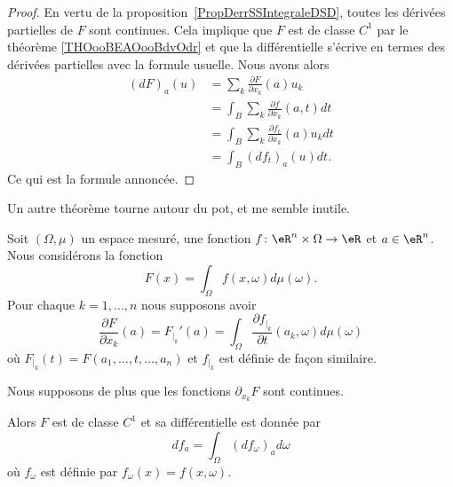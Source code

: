 \begin{proof}
	En vertu de la proposition~\ref{PropDerrSSIntegraleDSD}, toutes les dérivées partielles de \( F\) sont continues. Cela implique que \( F\) est de classe \( C^1\) par le théorème \ref{THOooBEAOooBdvOdr} et que la différentielle s'écrive en termes des dérivées partielles avec la formule usuelle. Nous avons alors
	\begin{subequations}
		\begin{align}
			(dF)_a(u) & =\sum_k\frac{ \partial F }{ \partial x_k }(a)u_k           \\
			          & =\int_B\sum_k\frac{ \partial f }{ \partial x_k }(a,t)dt    \\
			          & =\int_B\sum_k\frac{ \partial f_t }{ \partial x_k }(a)u_kdt \\
			          & =\int_B (df_t)_a(u)dt.
		\end{align}
	\end{subequations}
	Ce qui est la formule annoncée.
\end{proof}

Un autre théorème tourne autour du pot, et me semble inutile.
\begin{theorem} \label{ThoOLAQyRL}
	Soit \( (\Omega,\mu)\) un espace mesuré, une fonction \( f\colon \eR^n\times \Omega\to \eR\) et \( a\in \eR^n\). Nous considérons la fonction
	\begin{equation}
		F(x)=\int_{\Omega}f(x,\omega)d\mu(\omega).
	\end{equation}
	Pour chaque \( k=1,\ldots, n\) nous supposons avoir
	\begin{equation}
		\frac{ \partial F }{ \partial x_k }(a)=F_{|_k}'(a)=\int_{\Omega}\frac{ \partial f_{|_k} }{ \partial t }(a_k,\omega)d\mu(\omega)
	\end{equation}
	où \( F_{|_k}(t)=F(a_1,\ldots, t,\ldots, a_n)\) et \( f_{|_k}\) est définie de façon similaire.

	Nous supposons de plus que les fonctions \( \partial_{x_k}F\) sont continues.

	Alors \( F\) est de classe \( C^1\) et sa différentielle est donnée par
	\begin{equation}
		df_a=\int_{\Omega}(df_{\omega})_ad\omega
	\end{equation}
	où \( f_{\omega}\) est définie par \( f_{\omega}(x)=f(x,\omega)\).
\end{theorem}


